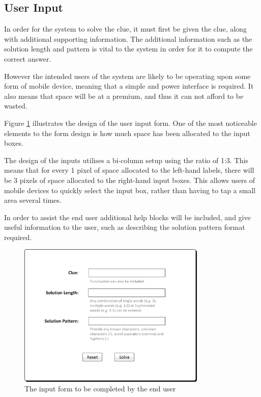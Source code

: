 \subsection{User Input} 
\label{sub:user_input}

In order for the system to solve the clue, it must first be given the clue, 
along with additional supporting information. The additional information such as 
the solution length and pattern is vital to the system in order for it to 
compute the correct answer. 

However the intended users of the system are likely to be operating upon some 
form of mobile device, meaning that a simple and power interface is required. It
also means that space will be at a premium, and thus it can not afford to be 
wasted.

Figure \ref{fig:input_form} illustrates the design of the user input form. One 
of the most noticeable elements to the form design is how much space has been 
allocated to the input boxes. 

The design of the inputs utilises a bi-column setup using the ratio of 1:3. This
means that for every 1 pixel of space allocated to the left-hand labels, there 
will be 3 pixels of space allocated to the right-hand input boxes. This allows 
users of mobile devices to quickly select the input box, rather than having to 
tap a small area several times.

In order to assist the end user additional help blocks will be included, and 
give useful information to the user, such as describing the solution pattern 
format required.

\begin{figure}[H]
  \centering
  \includegraphics[width=0.8\textwidth]{design/ui/form.jpg}
  \caption{The input form to be completed by the end user}
  \label{fig:input_form}
\end{figure}

